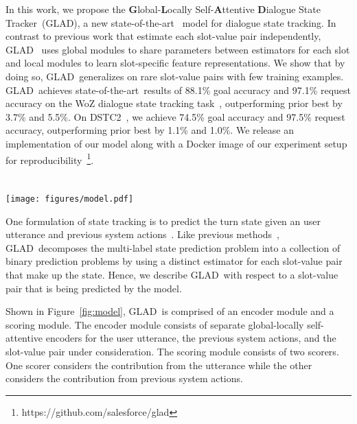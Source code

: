 \documentclass[11pt,a4paper]{article}
\newcommand{\modelnamehighlight}{\textbf{G}lobal-\textbf{L}ocally Self-\textbf{A}ttentive \textbf{D}ialogue State Tracker}
\newcommand{\modelnameshort}{GLAD}
\newcommand{\sota}{state-of-the-art}
\newcommand{\goaldiff}{3.7}  \newcommand{\requestdiff}{5.5}  \newcommand{\turngoalacc}{93.1}
\newcommand{\goalacc}{88.1}
\newcommand{\requestacc}{97.1}
\newcommand{\dstcgoaldiff}{1.1}  \newcommand{\dstcrequestdiff}{1.0}  \newcommand{\dstcgoalacc}{74.5}
\newcommand{\dstcrequestacc}{97.5}
\begin{document}
In this work, we propose the \modelnamehighlight~(\modelnameshort), a new \sota~ model for dialogue state tracking.
In contrast to previous work that estimate each slot-value pair independently,
\modelnameshort~ uses global modules to share parameters between estimators for each slot and local modules to learn slot-specific feature representations.
We show that by doing so, \modelnameshort~generalizes on rare slot-value pairs with few training examples.
\modelnameshort~achieves \sota~results of \goalacc\% goal accuracy and \requestacc\% request accuracy on the WoZ dialogue state tracking task~\citep{wen2017NetworkBasedEndToEndDialogueSystem}, outperforming prior best by \goaldiff\% and \requestdiff\%.
On DSTC2~\citep{dstc2}, we achieve \dstcgoalacc\% goal accuracy and \dstcrequestacc\% request accuracy, outperforming prior best by \dstcgoaldiff\% and \dstcrequestdiff\%.
We release an implementation of our model along with a Docker image of our experiment setup for reproducibility~\footnote{https://github.com/salesforce/glad}.






\section{\modelname}





\begin{figure*}[!t]
\centering
\texttt{[image: figures/model.pdf]}
\caption{
The \modelname.
}
\label{fig:model}
\end{figure*}







One formulation of state tracking is to predict the turn state given an user utterance and previous system actions~\citep{williams2007partially}.
Like previous methods~\citep{henderson2014word,wen2017NetworkBasedEndToEndDialogueSystem,mrkvsic2016neural}, \modelnameshort~decomposes the multi-label state prediction problem into a collection of binary prediction problems by using a distinct estimator for each slot-value pair that make up the state.
Hence, we describe \modelnameshort~with respect to a slot-value pair that is being predicted by the model.

Shown in Figure~\ref{fig:model}, \modelnameshort~is comprised of an encoder module and a scoring module.
The encoder module consists of separate global-locally self-attentive encoders for the user utterance, the previous system actions, and the slot-value pair under consideration.
The scoring module consists of two scorers.
One scorer considers the contribution from the utterance while the other considers the contribution from previous system actions.
\end{document}
